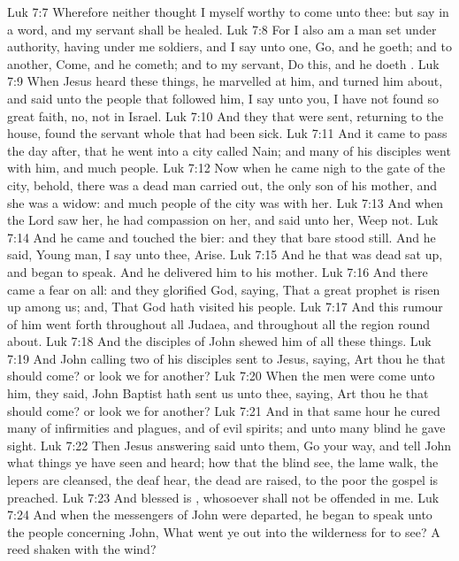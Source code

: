 \vs Luk 7:7 Wherefore neither thought I myself worthy to come unto thee: but say in a word, and my servant shall be healed.
\vs Luk 7:8 For I also am a man set under authority, having under me soldiers, and I say unto one, Go, and he goeth; and to another, Come, and he cometh; and to my servant, Do this, and he doeth .
\vs Luk 7:9 When Jesus heard these things, he marvelled at him, and turned him about, and said unto the people that followed him, I say unto you, I have not found so great faith, no, not in Israel.
\vs Luk 7:10 And they that were sent, returning to the house, found the servant whole that had been sick.
\vs Luk 7:11 And it came to pass the day after, that he went into a city called Nain; and many of his disciples went with him, and much people.
\vs Luk 7:12 Now when he came nigh to the gate of the city, behold, there was a dead man carried out, the only son of his mother, and she was a widow: and much people of the city was with her.
\vs Luk 7:13 And when the Lord saw her, he had compassion on her, and said unto her, Weep not.
\vs Luk 7:14 And he came and touched the bier: and they that bare  stood still. And he said, Young man, I say unto thee, Arise.
\vs Luk 7:15 And he that was dead sat up, and began to speak. And he delivered him to his mother.
\vs Luk 7:16 And there came a fear on all: and they glorified God, saying, That a great prophet is risen up among us; and, That God hath visited his people.
\vs Luk 7:17 And this rumour of him went forth throughout all Judaea, and throughout all the region round about.
\vs Luk 7:18 And the disciples of John shewed him of all these things.
\vs Luk 7:19 And John calling  two of his disciples sent  to Jesus, saying, Art thou he that should come? or look we for another?
\vs Luk 7:20 When the men were come unto him, they said, John Baptist hath sent us unto thee, saying, Art thou he that should come? or look we for another?
\vs Luk 7:21 And in that same hour he cured many of  infirmities and plagues, and of evil spirits; and unto many  blind he gave sight.
\vs Luk 7:22 Then Jesus answering said unto them, Go your way, and tell John what things ye have seen and heard; how that the blind see, the lame walk, the lepers are cleansed, the deaf hear, the dead are raised, to the poor the gospel is preached.
\vs Luk 7:23 And blessed is , whosoever shall not be offended in me.
\vs Luk 7:24 And when the messengers of John were departed, he began to speak unto the people concerning John, What went ye out into the wilderness for to see? A reed shaken with the wind?

